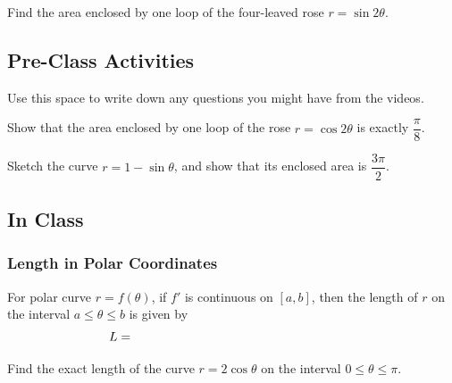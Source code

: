 \documentclass[notes]{subfiles}
\begin{document}
		\begin{ex}
			Find the area enclosed by one loop of the four-leaved rose $r = \sin 2\theta$.
		\end{ex}
			\newpage
		
		
			
	
		
	\subsection*{Pre-Class Activities}
		\begin{ex}
			Use this space to write down any questions you might have from the videos.
		\end{ex}
			
		\begin{ex}
			Show that the area enclosed by one loop of the rose $r = \cos 2\theta$ is exactly $\dfrac{\pi}{8}$.
		\end{ex}
			
		\begin{ex}
			Sketch the curve $r = 1-\sin \theta$, and show that its enclosed area is $\dfrac{3\pi}{2}$.
		\end{ex}
			\newpage
			
	\subsection*{In Class}
	\subsubsection*{Length in Polar Coordinates}
		\begin{rmk}
			For polar curve $r = f(\theta)$, if $f'$ is continuous on $[a,b]$, then the length of $r$ on the interval $a\leq \theta \leq b$ is given by\\[10pt]
				\[L = \hspace{2.5in}\]
		\end{rmk}
		\begin{pf}
		
		\end{pf}
			\vspace{2.5in}
			
		\begin{ex}
			Find the exact length of the curve $r = 2\cos\theta$ on the interval $0\leq \theta \leq \pi$.
		\end{ex}
			\newpage
			
\end{document}
